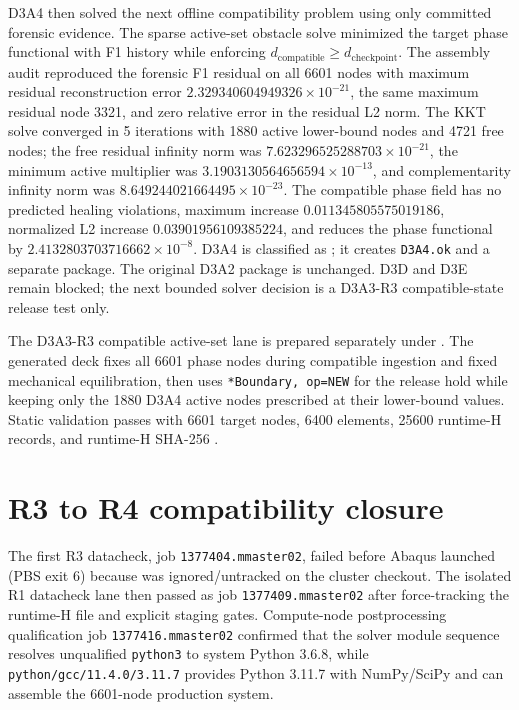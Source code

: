 D3A4 then solved the next offline compatibility problem using only committed
forensic evidence. The sparse active-set obstacle solve minimized the target
phase functional with F1 history while enforcing
\(d_\mathrm{compatible}\ge d_\mathrm{checkpoint}\). The assembly audit
reproduced the forensic F1 residual on all 6601 nodes with maximum residual
reconstruction error $2.329340604949326\times10^{-21}$, the same maximum
residual node 3321, and zero relative error in the residual L2 norm. The KKT
solve converged in 5 iterations with 1880 active lower-bound nodes and 4721
free nodes; the free residual infinity norm was
$7.623296525288703\times10^{-21}$, the minimum active multiplier was
$3.1903130564656594\times10^{-13}$, and complementarity infinity norm was
$8.649244021664495\times10^{-23}$. The compatible phase field has no predicted
healing violations, maximum increase $0.011345805575019186$, normalized L2
increase $0.03901956109385224$, and reduces the phase functional by
$2.4132803703716662\times10^{-8}$. D3A4 is classified as
; it creates
\texttt{D3A4.ok} and a separate
 package.
The original D3A2 package is unchanged. D3D and D3E remain blocked; the next
bounded solver decision is a D3A3-R3 compatible-state release test only.

The D3A3-R3 compatible active-set lane is prepared separately under
.
The generated deck fixes all 6601 phase nodes during compatible ingestion and
fixed mechanical equilibration, then uses \texttt{*Boundary, op=NEW} for the
release hold while keeping only the 1880 D3A4 active nodes prescribed at their
lower-bound values. Static validation passes with 6601 target nodes, 6400
elements, 25600 runtime-H records, and runtime-H SHA-256
.

\section{R3 to R4 compatibility closure}
The first R3 datacheck, job \texttt{1377404.mmaster02}, failed before Abaqus
launched (PBS exit 6) because
 was ignored/untracked on the
cluster checkout. The isolated R1 datacheck lane then passed as job
\texttt{1377409.mmaster02} after force-tracking the runtime-H file and explicit
staging gates. Compute-node postprocessing qualification job
\texttt{1377416.mmaster02} confirmed that the solver module sequence resolves
unqualified \texttt{python3} to system Python 3.6.8, while
\texttt{python/gcc/11.4.0/3.11.7} provides Python 3.11.7 with NumPy/SciPy and
can assemble the 6601-node production system.

